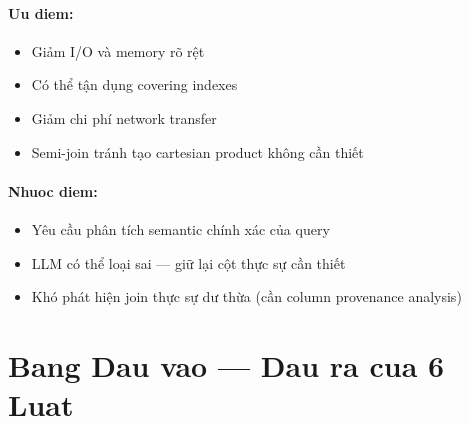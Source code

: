 \paragraph{Uu diem:}
\begin{itemize}
\item Giảm I/O và memory rõ rệt
\item Có thể tận dụng covering indexes
\item Giảm chi phí network transfer
\item Semi-join tránh tạo cartesian product không cần thiết
\end{itemize}
\paragraph{Nhuoc diem:}
\begin{itemize}
\item Yêu cầu phân tích semantic chính xác của query
\item LLM có thể loại sai — giữ lại cột thực sự cần thiết
\item Khó phát hiện join thực sự dư thừa (cần column provenance analysis)
\end{itemize}
\newpage

\section{Bang Dau vao — Dau ra cua 6 Luat}


